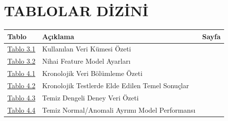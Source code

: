 \chapter*{TABLOLAR DİZİNİ}

\begin{longtable}{p{2cm}p{11cm}r}
\textbf{Tablo} & \textbf{Açıklama} & \textbf{Sayfa} \\ \hline
\hyperref[tab:veri_ozellikleri]{Tablo 3.1} & Kullanılan Veri Kümesi Özeti & \pageref{tab:veri_ozellikleri} \\
\hyperref[tab:hyperparams]{Tablo 3.2} & Nihai Feature Model Ayarları & \pageref{tab:hyperparams} \\
\hyperref[tab:kronolojik_bolumleme]{Tablo 4.1} & Kronolojik Veri Bölümleme Özeti & \pageref{tab:kronolojik_bolumleme} \\
\hyperref[tab:kronolojik_sonuclar]{Tablo 4.2} & Kronolojik Testlerde Elde Edilen Temel Sonuçlar & \pageref{tab:kronolojik_sonuclar} \\
\hyperref[tab:temiz_deney_ozet]{Tablo 4.3} & Temiz Dengeli Deney Veri Özeti & \pageref{tab:temiz_deney_ozet} \\
\hyperref[tab:temiz_model_performans]{Tablo 4.4} & Temiz Normal/Anomali Ayrımı Model Performansı & \pageref{tab:temiz_model_performans} \\
\end{longtable}
